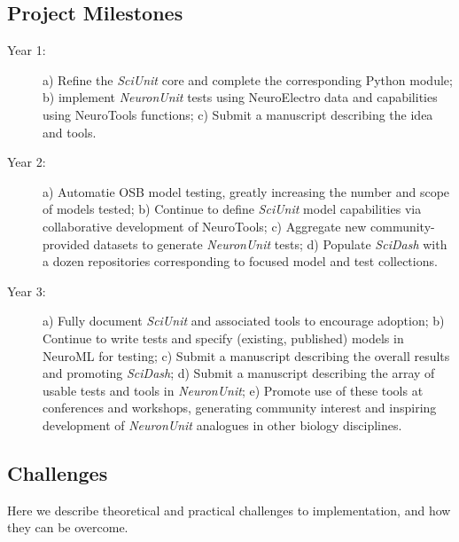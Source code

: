 \documentclass[11pt,letterpaper]{article}
\begin{document}
\subsection{Project Milestones}
\begin{description}
\item[Year 1:] a) Refine the \textit{SciUnit} core and complete the corresponding Python module; b) implement \textit{NeuronUnit} tests using NeuroElectro data and capabilities using NeuroTools functions; c) Submit a manuscript describing the idea and tools.  
\item[Year 2:] a) Automatie OSB model testing, greatly increasing the number and scope of models tested; b) Continue to define \textit{SciUnit} model capabilities via collaborative development of NeuroTools; c) Aggregate new community-provided datasets to generate \textit{NeuronUnit} tests; d) Populate \textit{SciDash} with a dozen repositories corresponding to focused model and test collections.    
\item[Year 3:] a) Fully document \textit{SciUnit} and associated tools to encourage adoption; b) Continue to write tests and specify (existing, published) models in NeuroML for testing; c) Submit a manuscript describing the overall results and promoting \textit{SciDash}; d) Submit a manuscript describing the array of usable tests and tools in \textit{NeuronUnit}; e) Promote use of these tools at conferences and workshops, generating community interest and inspiring development of \textit{NeuronUnit} analogues in other biology disciplines.  
\end{description}

\subsection{Challenges}
Here we describe theoretical and practical challenges to implementation, and how they can be overcome.
\end{document}
